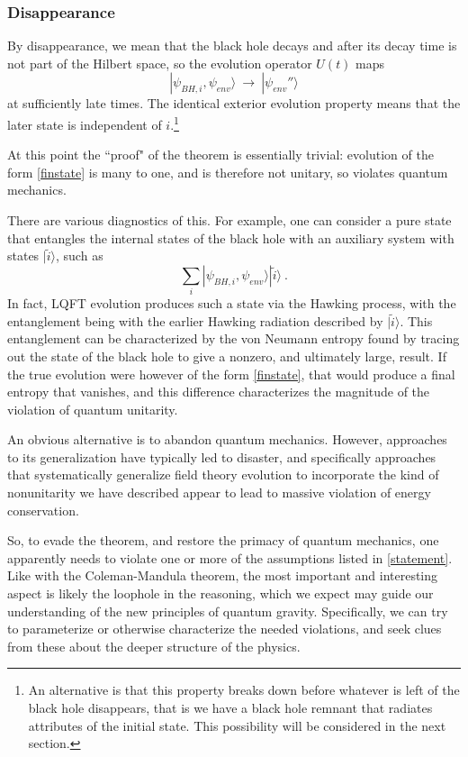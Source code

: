 \documentclass[12pt]{article}
\numberwithin{equation}{section}
\newcommand{\beq}{\begin{equation}}
\newcommand{\eeq}{\end{equation}}
\begin{document}
\subsubsection{Disappearance}

By disappearance, we mean that the black hole decays and after its decay time is not 
 part of the Hilbert space, so the evolution operator $U(t)$  maps
\beq\label{finstate}
|\psi_{BH,i},\psi_{env}\rangle\ \rightarrow\ |\psi_{env}''\rangle
\eeq
at sufficiently late times.  The identical exterior evolution property means that the later state is independent of $i$.\footnote{An alternative is that this property breaks down before whatever is left of the black hole disappears, that is we have a black hole remnant that radiates attributes of the initial state.  This possibility will be considered in the next section.}

At this point the ``proof" of the theorem is essentially trivial: evolution of the form \eqref{finstate} is many to one, and is therefore not unitary, so violates quantum mechanics.

There are various diagnostics of this.  For example, one can consider a pure state that entangles the internal states of the black hole with an auxiliary system with states $|\tilde i\rangle$, such as
\beq
\sum_i|\psi_{BH,i},\psi_{env}\rangle |\tilde i\rangle\ .
\eeq
In fact, LQFT evolution produces such a state via the Hawking process, with the entanglement being with the earlier Hawking radiation described by $|\tilde i\rangle$.  This entanglement  can be characterized by the von Neumann entropy found by tracing out the state of the black hole to give a nonzero, and ultimately large, result.  If the true evolution were  however of the form \eqref{finstate}, that would  produce a final entropy that vanishes, and this difference characterizes the magnitude of the violation of quantum unitarity.

An obvious alternative is to abandon quantum mechanics.  However, approaches to its generalization have typically led to disaster\cite{BPS,Polphone}, and specifically approaches that systematically generalize field theory evolution to incorporate the kind of nonunitarity we have described appear to lead to massive violation of energy conservation\cite{BPS}.

So, to evade the theorem, and restore the primacy of quantum mechanics, one apparently needs to violate one or more of the assumptions listed in \ref{statement}.  Like with the Coleman-Mandula theorem, the most important and interesting aspect is likely the loophole in the reasoning, which we expect may guide our understanding of the new principles of quantum gravity.  Specifically, we can try to parameterize or otherwise characterize the needed violations, and seek clues from these about the deeper structure of the physics.
\end{document}
